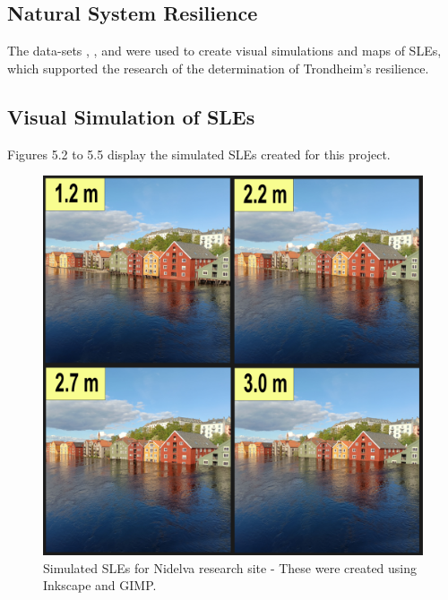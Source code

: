 \subsection{ Natural System Resilience}

The data-sets  \cite{geonorge_stormflo_nodate} , \cite{kartverket_se_2021}, \cite{stormflo_database_stormflo_2021} and \cite{ipcc_sea_2021} were used to create visual simulations and maps of SLEs, which supported the research of the determination of Trondheim's resilience. 

\subsection{Visual Simulation of SLEs}
 Figures 5.2 to 5.5 display the simulated SLEs created for this project. 

\begin{figure}[H]
    \centering
    \includegraphics[width=16cm]{fig_sle/nidelva 2090 q.png}
    \caption{Simulated SLEs for Nidelva research site - These were created using Inkscape and GIMP. }
    \label{fig:SLE-nidelva}
\end{figure}

